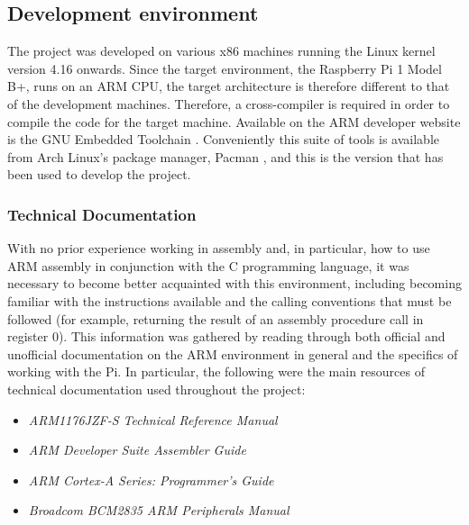 \subsection{Development environment}
    The project was developed on various x86 machines running the Linux kernel
    version 4.16 onwards. Since the target environment, the Raspberry Pi 1 Model
    B+, runs on an ARM CPU, the target architecture is therefore different to
    that of the development machines. Therefore, a cross-compiler is required in
    order to compile the code for the target machine. Available on the ARM
    developer website is the GNU Embedded Toolchain \cite{GNUToolchain}.
    Conveniently this suite of tools is available from Arch Linux's package
    manager, Pacman \cite{Pacman}, and this is the version that has been used to
    develop the project.

    \subsubsection{Technical Documentation}
        With no prior experience working in assembly and, in particular, how to
        use ARM assembly in conjunction with the C programming language, it was
        necessary to become better acquainted with this environment, including
        becoming familiar with the instructions available and the calling
        conventions that must be followed (for example, returning the result of
        an assembly procedure call in register 0). This information was gathered
        by reading through both official and unofficial documentation on the ARM
        environment in general and the specifics of working with the Pi. In
        particular, the following were the main resources of technical
        documentation used throughout the project:
        \begin{itemize}
            \itemsep0em 
            \item \textit{ARM1176JZF-S Technical Reference Manual} \cite{TRM}
            \item \textit{ARM Developer Suite Assembler Guide}
                \cite{OnlineARMGuide}
            \item \textit{ARM Cortex-A Series: Programmer's Guide}
                \cite{ProgrammersGuide}
            \item \textit{Broadcom BCM2835 ARM Peripherals Manual} \cite{BCM2835}
        \end{itemize}

